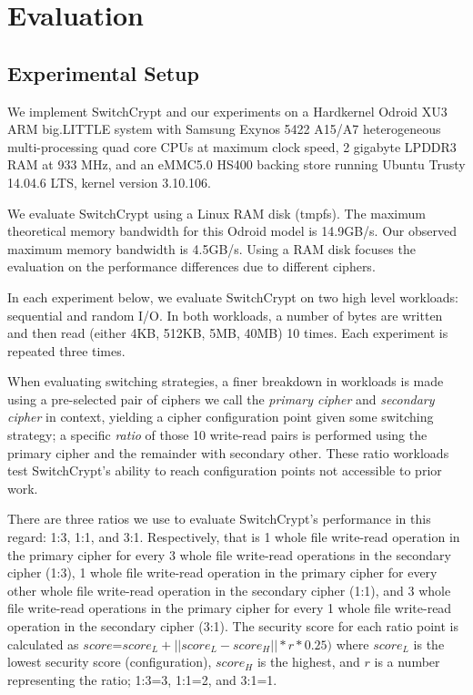 \section{Evaluation}\label{sec:evaluation}

\subsection{Experimental Setup}

We implement SwitchCrypt and our experiments on a Hardkernel Odroid XU3 ARM
big.LITTLE system with Samsung Exynos 5422 A15/A7 heterogeneous multi-processing
quad core CPUs at maximum clock speed, 2 gigabyte LPDDR3 RAM at 933 MHz, and an
eMMC5.0 HS400 backing store running Ubuntu Trusty 14.04.6 LTS, kernel version
3.10.106.

We evaluate SwitchCrypt using a Linux RAM disk (tmpfs). The maximum theoretical
memory bandwidth for this Odroid model is 14.9GB/s\@. Our observed maximum
memory bandwidth is 4.5GB/s. Using a RAM disk focuses the evaluation on the
performance differences due to different ciphers.

In each experiment below, we evaluate SwitchCrypt on two high level workloads:
sequential and random I/O. In both workloads, a number of bytes are written and
then read (either 4KB, 512KB, 5MB, 40MB) 10 times. Each experiment is repeated
three times.

When evaluating switching strategies, a finer breakdown in workloads is made
using a pre-selected pair of ciphers we call the \emph{primary cipher} and
\emph{secondary cipher} in context, yielding a cipher configuration point given
some switching strategy; a specific \emph{ratio} of those 10 write-read pairs is
performed using the primary cipher and the remainder with secondary other. These
ratio workloads test SwitchCrypt's ability to reach configuration points not
accessible to prior work.

There are three ratios we use to evaluate SwitchCrypt's performance in this
regard: 1:3, 1:1, and 3:1. Respectively, that is 1 whole file write-read
operation in the primary cipher for every 3 whole file write-read operations in
the secondary cipher (1:3), 1 whole file write-read operation in the primary
cipher for every other whole file write-read operation in the secondary cipher
(1:1), and 3 whole file write-read operations in the primary cipher for every 1
whole file write-read operation in the secondary cipher (3:1). The security
score for each ratio point is calculated as $score$=$score_L + ||score_L -
score_H|| * r * 0.25)$ where $score_L$ is the lowest security score
(configuration), $score_H$ is the highest, and $r$ is a number representing the
ratio; 1:3=3, 1:1=2, and 3:1=1.

